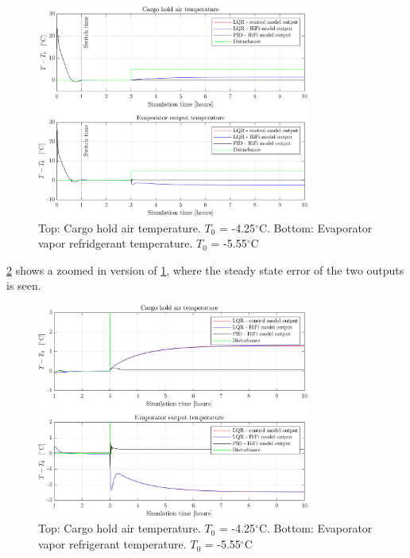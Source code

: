 \begin{figure}[H]
	\centering
	\includegraphics[width=0.8\textwidth]{Graphics/fig_LQRvsKresten_stepDist.png}
	\caption{Top: Cargo hold air temperature. $T_0$ = -4.25$^{\circ}$C. Bottom: Evaporator vapor refridgerant temperature. $T_0$ = -5.55$^{\circ}$C}
	\label{fig:LQR_wellTuned_5stepDist}
\end{figure}

\cref{fig:LQR_wellTuned_5stepDist_zoom} shows a zoomed in version of \cref{fig:LQR_wellTuned_5stepDist}, where the steady state error of the two outputs is seen.\\

\begin{figure}[H]
	\centering
	\includegraphics[width=0.8\textwidth]{Graphics/fig_LQRvsKresten_stepDist_zoom.png}
	\caption{Top: Cargo hold air temperature. $T_0$ = -4.25$^{\circ}$C. Bottom: Evaporator vapor refrigerant temperature. $T_0$ = -5.55$^{\circ}$C}
	\label{fig:LQR_wellTuned_5stepDist_zoom}
\end{figure}

